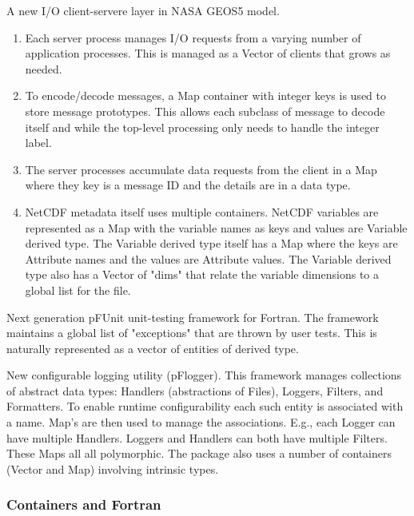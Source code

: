 \documentclass{article}
\begin{document}
A new I/O client-servere layer in NASA GEOS5 model.   

\begin{enumerate}
\item Each server process manages I/O requests from a varying      number of application processes.  This is managed as a Vector of      clients that grows as needed.

\item To encode/decode messages, a Map container with integer keys is       used to store message prototypes.  This allows each subclass of       message to decode itself and while the top-level processing       only needs to handle the integer label.

\item The server processes accumulate data requests from the client        in a Map where they key is a message ID and the details are in        a data type.

\item NetCDF metadata itself uses multiple containers.  NetCDF       variables are represented as a Map with the variable names as       keys and values are Variable derived type.  The Variable
       derived type itself has a Map where the keys are Attribute       names and the values are Attribute values.  The Variable       derived type also has a Vector of "dims" that relate the
       variable dimensions to a global list for the file.
\end{enumerate}

 Next generation pFUnit unit-testing framework for Fortran.  The  framework maintains a global list of "exceptions" that are thrown by user tests.  This is naturally represented as a vector of entities of derived type.

 New configurable logging utility (pFlogger).  This framework   manages collections of abstract data types: Handlers (abstractions   of Files), Loggers, Filters, and Formatters.  To enable runtime
   configurability each such entity is associated with a name.  Map's   are then used to manage the associations.  E.g., each Logger can   have multiple Handlers.  Loggers and Handlers can both have
   multiple Filters.  These Maps all all polymorphic.  The package   also uses a number of containers (Vector and Map) involving   intrinsic types.

\subsubsection{Containers and Fortran}
\end{document}
